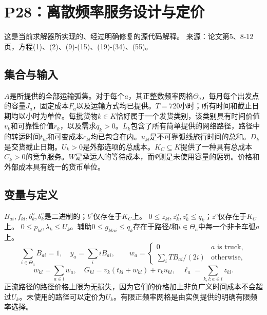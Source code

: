\documentclass[11pt]{article}
\begin{document}
\section*{P28：离散频率服务设计与定价}
这是当前求解器所实现的、经过明确修复的源代码解释。  
来源：论文第5、8-12页，方程(1)、(2)、(9)-(15)、(19)-(34)、(55)。

\subsection*{集合与输入}
$A$是所提供的全部运输弧集。对于每个$a$，其正整数频率网格$\Theta_a$，每月每个出发点的容量$J_a$，固定成本$F_a$以及运输方式均已提供。$T=720$小时；所有时间和截止日期均以小时为单位。每批货物$k\in K$恰好属于一个发货类别，该类别具有时间价值$v_k$和可靠性价值$r_k$，以及需求$q_k>0$。$L_k$包含了所有简单提供的网络路径，路径中的转运时间$t_{kl}$和可变成本$c_{kl}$均已包含在内。$u_{kl}$是不可靠弧线旅行时间的总和。$D_k$是交货截止日期。$U_k>0$是外部选项的总成本。$K_C\subseteq K$提供了一种具有总成本$C_k>0$的竞争服务。$W$是承运人的等待成本，而$\Psi$则是未使用容量的惩罚。价格和外部成本具有统一的货币单位。

\subsection*{变量与定义}
$B_{ai},f_{kl},b_k^o,b_k^c$是二进制的；$b^c$仅存在于$K_C$上。
$0\le z_{kl},z_k^o,z_k^c\le q_k$；$z^c$仅存在于$K_C$上。
$0\le p_{kl},\lambda_k\le U_k$。辅助$0\le g_{klai}\le q_k$存在于路径$l$和$i\in\Theta_a$中每一个非卡车弧$a$上。
\[
 \sum_{i\in\Theta_a} B_{ai}=1,\quad
 y_a=\sum_i i B_{ai},\qquad
 w_a=\begin{cases}0& a\text{ is truck},\\
 \sum_i T B_{ai}/(2i)&\text{otherwise},\end{cases}
\]
\[
 w_{kl}=\sum_{a\in l}w_a,\quad
 G_{kl}=v_k(t_{kl}+w_{kl})+r_k u_{kl},\quad
 \ell_a=\sum_{k,l:a\in l}z_{kl}.
\]
正流路径的路径价格上限为无损失，因为它们的价格加上非负广义时间成本不会超过$U_k$。未使用的路径可以定价为$U_k$。有限正频率网格是由实例提供的明确有限频率选择。
\end{document}
